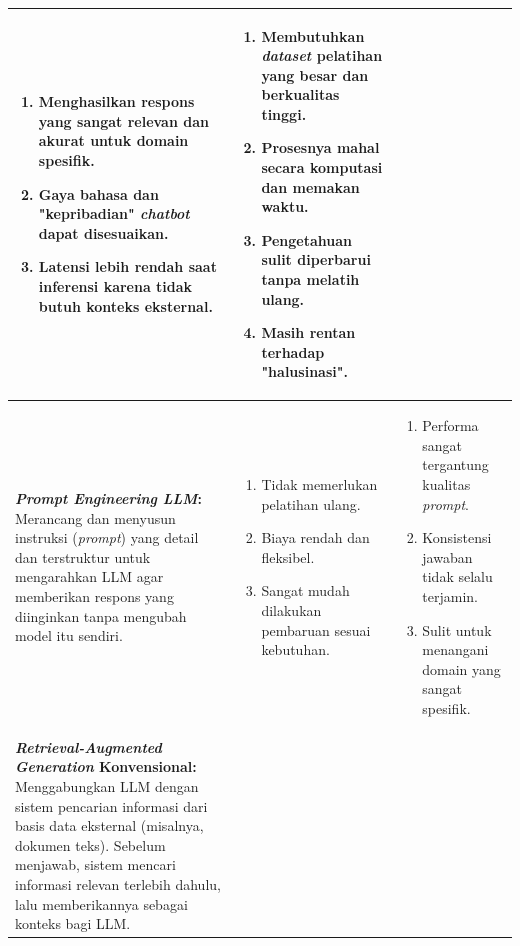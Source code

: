 \begin{longtable}{|p{4cm}|p{5cm}|p{5cm}|}
	\begin{enumerate}
		\item Menghasilkan respons yang sangat relevan dan akurat untuk domain spesifik.
		\item Gaya bahasa dan "kepribadian" \textit{chatbot} dapat disesuaikan.
		\item Latensi lebih rendah saat inferensi karena tidak butuh konteks eksternal.
	\end{enumerate}
	                                                                                                                                                                               &
	\begin{enumerate}
		\item Membutuhkan \textit{dataset} pelatihan yang besar dan berkualitas tinggi.
		\item Prosesnya mahal secara komputasi dan memakan waktu.
		\item Pengetahuan sulit diperbarui tanpa melatih ulang.
		\item Masih rentan terhadap "halusinasi".
	\end{enumerate}
	\\
	\hline
	\textbf{\textit{Prompt Engineering LLM}: }
	Merancang dan menyusun instruksi (\textit{prompt}) yang detail dan terstruktur untuk mengarahkan LLM agar memberikan respons yang diinginkan tanpa mengubah model itu sendiri. &

	\begin{enumerate}
		\item Tidak memerlukan pelatihan ulang.
		\item Biaya rendah dan fleksibel.
		\item Sangat mudah dilakukan pembaruan sesuai kebutuhan.
	\end{enumerate}
	                                                                                                                                                                               &
	\begin{enumerate}
		\item Performa sangat tergantung kualitas \textit{prompt}.
		\item Konsistensi jawaban tidak selalu terjamin.
		\item Sulit untuk menangani domain yang sangat spesifik.
	\end{enumerate}
	\\
	\hline
	\textbf{\textit{Retrieval-Augmented Generation} Konvensional: }
	Menggabungkan LLM dengan sistem pencarian informasi dari basis data eksternal (misalnya, dokumen teks).
	Sebelum menjawab, sistem mencari informasi relevan terlebih dahulu, lalu memberikannya sebagai konteks bagi LLM.                                                               &


\end{longtable}
